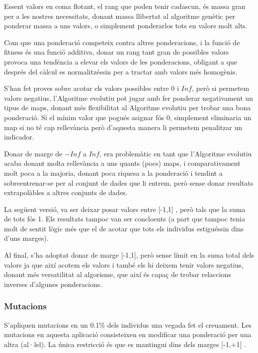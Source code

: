 \documentclass[titlepage,a4paper,12pt]{book}
\begin{document}
Essent valors en coma flotant, el rang que poden tenir cadascun, és massa gran
per a les nostres necessitats, donant massa llibertat al algoritme genètic per
ponderar massa a uns valors, o simplement ponderarlos tots en valors molt alts.

Com que una ponderació competeix contra altres ponderacions, i la funció de
fitness és una funció additiva, donar un rang tant gran de possibles valors
provoca una tendència a elevar els valors de les ponderacions, obligant a que
després del càlcul es normalitzéssin per a tractar amb valors més homogènis.

S'han fet proves sobre acotar els valors possibles entre 0 i $Inf$, però si
permetem valors negatius, l'Algoritme evolutiu pot jugar amb fer ponderar
negativament un tipus de maps, donant més flexibilitat al Algoritme evolutiu per
trobar una bona ponderació.  Si el mínim valor que pogués asignar fós 0,
simplement eliminaria un map si no té cap rellevància però d'aquesta manera li
permetem penalitzar un indicador.

Donar de marge de $-Inf$ a $Inf$, era problemàtic en tant que l'Algoritme
evolutiu acaba donant molta rellevància a uns quants (pocs) maps, i
comparativament molt poca a la majoria, donant poca riquesa a la ponderació i
tendint a sobreentrenar-se per al conjunt de dades que li entrem, però sense
donar resultats extrapolàbles a altres conjunts de dades.

La següent versió, va ser deixar posar valors entre [-1,1] , però tals que la
suma de tots fós 1.  Els resultats tampoc van ser concloents (a part que tampoc
tenia molt de sentit lògic més que el de acotar que tots els individus
estiguéssin dins d'uns marges).

Al final, s'ha adoptat donar de marge [-1,1], però sense límit en la suma total
dels valors ja que així acotem els valors i també els hi deixem tenir valors
negatius, donant més versatilitat al algorisme, que així és capaç de trobar
relaccions inverses d'algunes ponderacions.


\subsubsection{Mutacions} %
\label{ssub:Mutacions}

S'apliquen mutacions en un 0.1\% dels individus una vegada fet el creuament.
Les mutacions en aquesta aplicació consisteixen en modificar una ponderació per
una altra (al·lel).  La única restricció és que es mantingui dins dels marges
[-1,+1] .  
\end{document}
